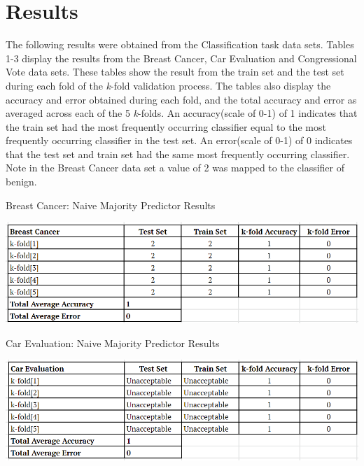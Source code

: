 \documentclass[twoside,11pt]{article}
\begin{document}
\newpage

\section{Results}
The following results were obtained from the Classification task data sets.
Tables 1-3 display the results from the Breast Cancer, Car Evaluation and Congressional Vote data sets. These tables show the result from the train set and the test set during each fold of the \textit{k}-fold validation process. The tables also display the accuracy and error obtained during each fold, and the total accuracy and error as averaged across each of the 5 \textit{k}-folds. An accuracy(scale of 0-1) of 1 indicates that the train set had the most frequently occurring classifier equal to the most frequently occurring classifier in the test set. An error(scale of 0-1) of 0 indicates that the test set and train set had the same most frequently occurring classifier. Note in the Breast Cancer data set a value of 2 was mapped to the classifier of benign.\\ 

\begin{table}[h!]
	\begin{center}
		\caption{Breast Cancer: Naive Majority Predictor Results}
		\label{tab:table1}
		\includegraphics[scale=.6]{BC_Results}\newline
	\end{center}
\end{table}

\begin{table}[h!]
	\begin{center}
		\caption{Car Evaluation: Naive Majority Predictor Results}
		\label{tab:table2}
		\includegraphics[scale=.6]{CE_Results}\newline
	\end{center}
\end{table}
\end{document}
